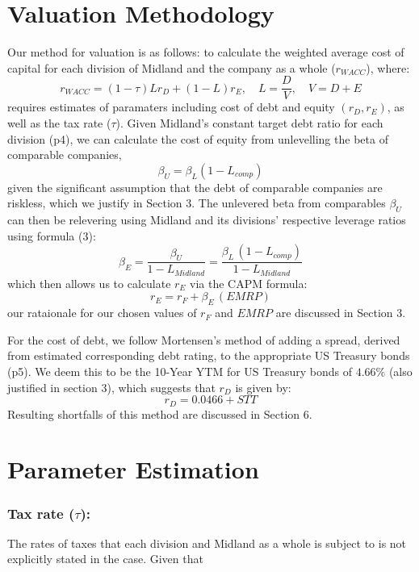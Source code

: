 \documentclass{article}
\begin{document}
\section{Valuation Methodology}
Our method for valuation is as follows: to calculate the weighted average cost of capital for each division of Midland and the company as a whole ($r_{W\!ACC}$), where:
\begin{equation}
    r_{W\!ACC} = (1 - \tau)Lr_{D} + (1-L)r_E, \quad L=\frac{D}{V}, \quad V=D+E
\end{equation}
requires estimates of paramaters including cost of debt and equity $(r_{D},r_{E})$, as well as the tax rate ($\tau$). Given Midland's constant target debt ratio for each division (p4), we can calculate the cost of equity from unlevelling the beta of comparable companies, 
\begin{equation}
    \beta_U=\beta_L(1-L_{comp})
\end{equation}
given the significant assumption that the debt of comparable companies are riskless, which we justify in Section 3. The unlevered beta from comparables $\beta_U$ can then be relevering using Midland and its divisions' respective leverage ratios using formula (3):
\begin{equation}
    \beta_E=\frac{\beta_U}{1-L_{Midland}}=\frac{\beta_L\,(1-L_{comp})}{1-L_{Midland}}
\end{equation} which then allows us to calculate $r_E$ via the CAPM formula:
\begin{equation}
    r_E=r_F+\beta_E\,(EMRP)
\end{equation}
our rataionale for our chosen values of $r_F$ and $EMRP$ are discussed in Section 3.

For the cost of debt, we follow Mortensen's method of adding a spread, derived from estimated corresponding debt rating, to the appropriate US Treasury bonds (p5). We deem this to be the 10-Year YTM for US Treasury bonds of $4.66\%$ (also justified in section 3), which suggests that $r_D$ is given by:
\begin{equation}
    r_D=0.0466+STT
\end{equation}
Resulting shortfalls of this method are discussed in Section 6.

\pagebreak
\hrulefill
\section{Parameter Estimation}
\subsubsection*{Tax rate ($\tau$):}The rates of taxes that each division and Midland as a whole is subject to is not explicitly stated in the case. Given that 
\end{document}
